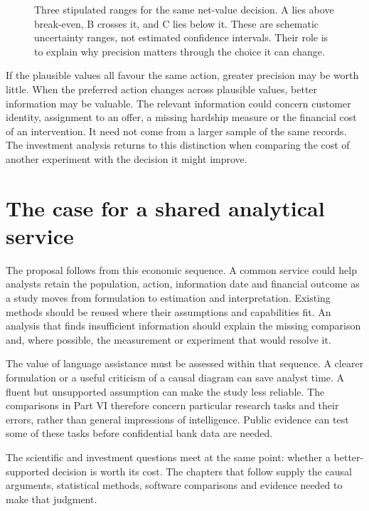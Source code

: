 \begin{figure}[htbp]\centering
{}
\caption{Three stipulated ranges for the same net-value decision. A lies above
break-even, B crosses it, and C lies below it. These are schematic uncertainty
ranges, not estimated confidence intervals. Their role is to explain why
precision matters through the choice it can change.}
\label{reading:uncertainty}
\end{figure}

If the plausible values all favour the same action, greater precision may be
worth little. When the preferred action changes across plausible values, better
information may be valuable. The relevant information could concern customer
identity, assignment to an offer, a missing hardship measure or the financial
cost of an intervention. It need not come from a larger sample of the same
records. The investment analysis returns to this distinction when comparing
the cost of another experiment with the decision it might improve.

\section{The case for a shared analytical service}

The proposal follows from this economic sequence. A common service could help
analysts retain the population, action, information date and financial outcome
as a study moves from formulation to estimation and interpretation. Existing
methods should be reused where their assumptions and capabilities fit. An
analysis that finds insufficient information should explain the missing
comparison and, where possible, the measurement or experiment that would
resolve it.

The value of language assistance must be assessed within that sequence. A
clearer formulation or a useful criticism of a causal diagram can save analyst
time. A fluent but unsupported assumption can make the study less reliable.
The comparisons in Part VI therefore concern particular research tasks and
their errors, rather than general impressions of intelligence. Public evidence
can test some of these tasks before confidential bank data are needed.

The scientific and investment questions meet at the same point: whether a
better-supported decision is worth its cost. The chapters that follow supply
the causal arguments, statistical methods, software comparisons and evidence
needed to make that judgment.
